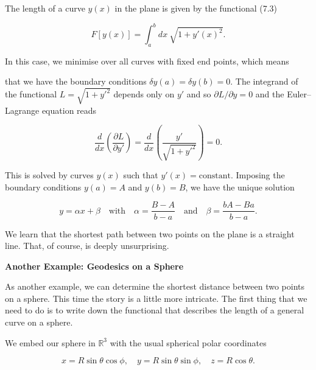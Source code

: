 \documentclass[11pt,a4paper,twoside]{article}
\newcommand{\pnum}[1]{\makebox[0pt][r]{\scriptsize\textbf{[#1]}\hspace{0.7em}}}
\begin{document}
\noindent\pnum{18}The length of a curve $y(x)$ in the plane is given by the functional (7.3)

\begin{equation}
    F[y(x)]=\int_a^b dx\ \sqrt{1+y'(x)^2}.\tag{7.12}
\end{equation}

\noindent\pnum{19}In this case, we minimise over all curves with fixed end points, which means


\noindent that we have the boundary conditions $\delta y(a)=\delta y(b)=0$. The integrand of the functional $L=\sqrt{1+y'^2}$ depends only on $y'$ and so $\partial L/\partial y=0$ and the Euler--Lagrange equation reads

\begin{equation}
    \frac{d}{dx}\left(\frac{\partial L}{\partial y'}\right)=\frac{d}{dx}\left(\frac{y'}{\sqrt{1+y'^2}}\right)=0.\tag{7.13}
\end{equation}

\noindent\pnum{20}This is solved by curves $y(x)$ such that $y'(x)=\text{constant}$. Imposing the boundary conditions $y(a)=A$ and $y(b)=B$, we have the unique solution

\begin{equation}
    y=\alpha x+\beta\quad\text{with}\quad\alpha=\frac{B-A}{b-a}\quad\text{and}\quad\beta=\frac{bA-Ba}{b-a}.\tag{7.14}
\end{equation}

\noindent\pnum{21}We learn that the shortest path between two points on the plane is a straight line. That, of course, is deeply unsurprising.



\newpage

\begin{center}\large\bfseries Another Example: Geodesics on a Sphere\end{center}

\noindent\pnum{22}As another example, we can determine the shortest distance between two points on a sphere. This time the story is a little more intricate. The first thing that we need to do is to write down the functional that describes the length of a general curve on a sphere.



\noindent\pnum{23}We embed our sphere in $\mathbb{R}^3$ with the usual spherical polar coordinates

\begin{equation}
    x=R\sin\theta\cos\phi,\quad y=R\sin\theta\sin\phi,\quad z=R\cos\theta.\tag{7.15}
\end{equation}
\end{document}
